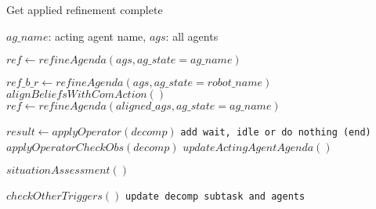 \begin{algorithm}
\caption{Get applied refinement complete}\label{alg:cacc}
\begin{algorithmic}
\Require $ag\_name$: acting agent name, $ags$: all agents

\State $ref \gets refineAgenda(ags, ag\_state=ag\_name)$

\State $ref\_b\_r \gets refineAgenda(ags, ag\_state=robot\_name)$
 
    \State $alignBeliefsWithComAction()$
    \State $ref \gets refineAgenda(aligned\_ags, ag\_state=ag\_name)$
\EndIf


    \State $result \gets applyOperator(decomp)$ 
        \State \texttt{add wait, idle or do nothing (end)}
    \Else
        \State $applyOperatorCheckObs(decomp)$
        \State $updateActingAgentAgenda()$
        
            \State $situationAssessment()$
        \EndIf
        
        \State $checkOtherTriggers()$
        \State \texttt{update decomp subtask and agents}
    \EndIf
\EndFor

\end{algorithmic}
\end{algorithm}

